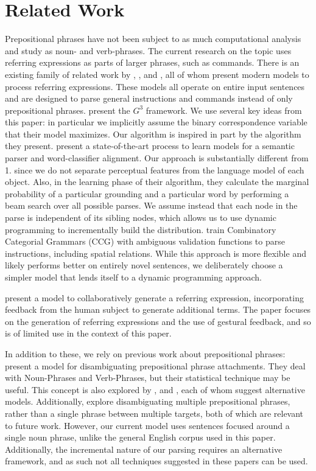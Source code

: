 \documentclass[conference]{IEEEtran}
\numberwithin{equation}{section}
\begin{document}
\section{Related Work}

Prepositional phrases have not been subject to as much computational analysis and study as noun- and verb-phrases. The current research on the topic uses referring expressions as parts of larger phrases, such as commands. There is an existing family of related work by \citet{tellex2011understanding}, \citet{UW_RSE_ICML2012}, and \citet{artzi2013weakly}, all of whom present modern models to process referring expressions. These models all operate on entire input sentences and are designed to parse general instructions and commands instead of only prepositional phrases. 
\citet{tellex2011understanding} present the $G^3$ framework. We use several key ideas from this paper: in particular we implicitly assume the binary correspondence variable that their model maximizes. Our algorithm is inspired in part by the algorithm they present.
\citet{UW_RSE_ICML2012} present a state-of-the-art process to learn models for a semantic parser and word-classifier alignment. Our approach is substantially different from \citeauthor{UW_RSE_ICML2012}1. since we do not separate perceptual features from the language model of each object. Also, in the learning phase of their algorithm, they calculate the marginal probability of a particular grounding and a particular word by performing a beam search over all possible parses. We assume instead that each node in the parse is independent of its sibling nodes, which allows us to use dynamic programming to incrementally build the distribution.
\citet{artzi2013weakly} train Combinatory Categorial Grammars (CCG) with ambiguous validation functions to parse instructions, including spatial relations. While this approach is more flexible and likely performs better on entirely novel sentences, we deliberately choose a simpler model that lends itself to a dynamic programming approach.

\citet{fang2015embodied} present a model to collaboratively generate a referring expression, incorporating feedback from the human subject to generate additional terms. The paper focuses on the generation of referring expressions and the use of gestural feedback, and so is of limited use in the context of this paper.

In addition to these, we rely on previous work about prepositional phrases: \citet{collins95} present a model for disambiguating prepositional phrase attachments. They deal with Noun-Phrases and Verb-Phrases, but their statistical technique may be useful. This concept is also explored by \citet{ratna98}, and \citet{brill94}, each of whom suggest alternative models. Additionally, \citet{merlo97} explore disambiguating multiple prepositional phrases, rather than a single phrase between multiple targets, both of which are relevant to future work. However, our current model uses sentences focused around a single noun phrase, unlike the general English corpus used in this paper. Additionally, the incremental nature of our parsing requires an alternative framework, and as such not all techniques suggested in these papers can be used.
\end{document}
